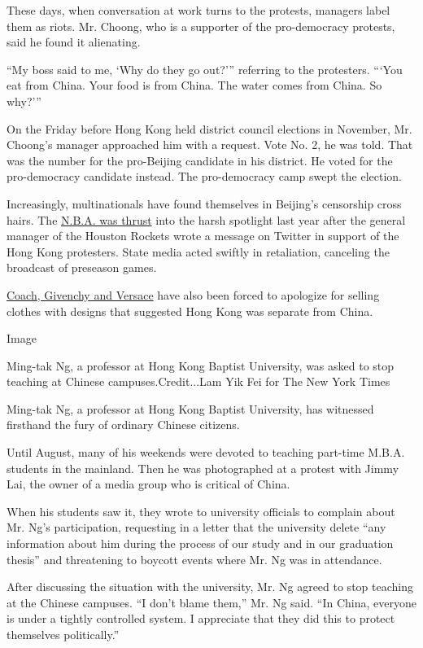 These days, when conversation at work turns to the protests, managers
label them as riots. Mr. Choong, who is a supporter of the pro-democracy
protests, said he found it alienating.

``My boss said to me, `Why do they go out?''' referring to the
protesters. ```You eat from China. Your food is from China. The water
comes from China. So why?'''

On the Friday before Hong Kong held district council elections in
November, Mr. Choong's manager approached him with a request. Vote No.
2, he was told. That was the number for the pro-Beijing candidate in his
district. He voted for the pro-democracy candidate instead. The
pro-democracy camp swept the election.

Increasingly, multinationals have found themselves in Beijing's
censorship cross hairs. The
\href{https://www.nytimes3xbfgragh.onion/2019/10/07/sports/basketball/nba-china-hong-kong.html}{N.B.A.
was thrust} into the harsh spotlight last year after the general manager
of the Houston Rockets wrote a message on Twitter in support of the Hong
Kong protesters. State media acted swiftly in retaliation, canceling the
broadcast of preseason games.

\href{https://www.nytimes3xbfgragh.onion/2019/08/12/fashion/china-donatella-versace-t-shirt.html}{Coach,
Givenchy and Versace} have also been forced to apologize for selling
clothes with designs that suggested Hong Kong was separate from China.

Image

Ming-tak Ng, a professor at Hong Kong Baptist University, was asked to
stop teaching at Chinese campuses.Credit...Lam Yik Fei for The New York
Times

Ming-tak Ng, a professor at Hong Kong Baptist University, has witnessed
firsthand the fury of ordinary Chinese citizens.

Until August, many of his weekends were devoted to teaching part-time
M.B.A. students in the mainland. Then he was photographed at a protest
with Jimmy Lai, the owner of a media group who is critical of China.

When his students saw it, they wrote to university officials to complain
about Mr. Ng's participation, requesting in a letter that the university
delete ``any information about him during the process of our study and
in our graduation thesis'' and threatening to boycott events where Mr.
Ng was in attendance.

After discussing the situation with the university, Mr. Ng agreed to
stop teaching at the Chinese campuses. ``I don't blame them,'' Mr. Ng
said. ``In China, everyone is under a tightly controlled system. I
appreciate that they did this to protect themselves politically.''

